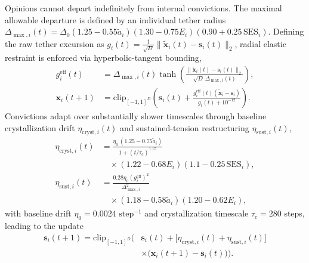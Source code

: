\documentclass[a4paper,fleqn]{cas-dc}
\begin{document}
Opinions cannot depart indefinitely from internal convictions. The maximal allowable departure is defined by an individual tether radius $\Delta_{\max, i}(t) = \Delta_0 (1.25 - 0.55\tilde{a}_i)(1.30 - 0.75 E_i)(0.90 + 0.25\,\mathrm{SES}_i)$. Defining the raw tether excursion as $g_i(t) = \frac{1}{\sqrt{D}}\|\tilde{\mathbf{x}}_i(t) - \mathbf{s}_i(t)\|_2$, radial elastic restraint is enforced via hyperbolic-tangent bounding,
\begin{align}
    g_i^{\mathrm{eff}}(t) &= \Delta_{\max, i}(t) \tanh\!\left(\frac{\|\tilde{\mathbf{x}}_i(t) - \mathbf{s}_i(t)\|_2}{\sqrt{D}\,\Delta_{\max, i}(t)}\right), \label{eq:methods_tether_radius} \\
    \mathbf{x}_i(t+1) &= \mathrm{clip}_{[-1, 1]^D}\!\left(\mathbf{s}_i(t) + \frac{g_i^{\mathrm{eff}}(t)(\tilde{\mathbf{x}}_i - \mathbf{s}_i)}{g_i(t) + 10^{-12}}\right). \label{eq:methods_tether_update}
\end{align}
Convictions adapt over substantially slower timescales through baseline crystallization drift $\eta_{\mathrm{cryst}, i}(t)$ and sustained-tension restructuring $\eta_{\mathrm{sust}, i}(t)$,
\begin{align}
    \eta_{\mathrm{cryst}, i}(t) &= \frac{\eta_0\,(1.25 - 0.75\tilde{a}_i)}{1 + (t/\tau_c)^{1.15}} \nonumber \\
    &\quad \times (1.22 - 0.68 E_i)(1.1 - 0.25\,\mathrm{SES}_i), \label{eq:methods_cryst} \\
    \eta_{\mathrm{sust}, i}(t) &= \frac{0.28\eta_0 (g_i^{\mathrm{eff}})^2}{\Delta_{\max, i}^2} \nonumber \\
    &\quad \times (1.18 - 0.58\tilde{a}_i)(1.20 - 0.62 E_i), \label{eq:methods_sust}
\end{align}
with baseline drift $\eta_0 = 0.0024 \text{ step}^{-1}$ and crystallization timescale $\tau_c = 280$ steps, leading to the update
\begin{equation}
\begin{aligned}
    \mathbf{s}_i(t+1) = \mathrm{clip}_{[-1, 1]^D}\!\Big(& \mathbf{s}_i(t) + \big[\eta_{\mathrm{cryst}, i}(t) + \eta_{\mathrm{sust}, i}(t)\big] \\
    & \times \big(\mathbf{x}_i(t+1) - \mathbf{s}_i(t)\big)\Big).
\end{aligned}
\label{eq:methods_conviction}
\end{equation}
\end{document}
